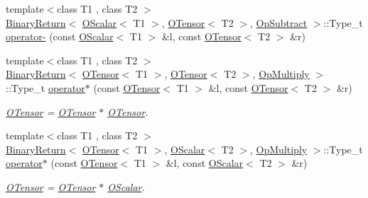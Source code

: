 \begin{DoxyCompactItemize}
\item 
{\footnotesize template$<$class T1 , class T2 $>$ }\\\mbox{\hyperlink{structENSEM_1_1BinaryReturn}{Binary\+Return}}$<$ \mbox{\hyperlink{classENSEM_1_1OScalar}{O\+Scalar}}$<$ T1 $>$, \mbox{\hyperlink{classENSEM_1_1OTensor}{O\+Tensor}}$<$ T2 $>$, \mbox{\hyperlink{structENSEM_1_1OpSubtract}{Op\+Subtract}} $>$\+::Type\+\_\+t \mbox{\hyperlink{group__obstensor_gadc53621528bc3dd8257b504bff4ec21e}{operator-\/}} (const \mbox{\hyperlink{classENSEM_1_1OScalar}{O\+Scalar}}$<$ T1 $>$ \&l, const \mbox{\hyperlink{classENSEM_1_1OTensor}{O\+Tensor}}$<$ T2 $>$ \&r)
\item 
{\footnotesize template$<$class T1 , class T2 $>$ }\\\mbox{\hyperlink{structENSEM_1_1BinaryReturn}{Binary\+Return}}$<$ \mbox{\hyperlink{classENSEM_1_1OTensor}{O\+Tensor}}$<$ T1 $>$, \mbox{\hyperlink{classENSEM_1_1OTensor}{O\+Tensor}}$<$ T2 $>$, \mbox{\hyperlink{structENSEM_1_1OpMultiply}{Op\+Multiply}} $>$\+::Type\+\_\+t \mbox{\hyperlink{group__obstensor_ga45559bd4234015a910a92c2eb80a69d5}{operator$\ast$}} (const \mbox{\hyperlink{classENSEM_1_1OTensor}{O\+Tensor}}$<$ T1 $>$ \&l, const \mbox{\hyperlink{classENSEM_1_1OTensor}{O\+Tensor}}$<$ T2 $>$ \&r)
\begin{DoxyCompactList}\small\item\em \mbox{\hyperlink{classENSEM_1_1OTensor}{O\+Tensor}} = \mbox{\hyperlink{classENSEM_1_1OTensor}{O\+Tensor}} $\ast$ \mbox{\hyperlink{classENSEM_1_1OTensor}{O\+Tensor}}. \end{DoxyCompactList}\item 
{\footnotesize template$<$class T1 , class T2 $>$ }\\\mbox{\hyperlink{structENSEM_1_1BinaryReturn}{Binary\+Return}}$<$ \mbox{\hyperlink{classENSEM_1_1OTensor}{O\+Tensor}}$<$ T1 $>$, \mbox{\hyperlink{classENSEM_1_1OScalar}{O\+Scalar}}$<$ T2 $>$, \mbox{\hyperlink{structENSEM_1_1OpMultiply}{Op\+Multiply}} $>$\+::Type\+\_\+t \mbox{\hyperlink{group__obstensor_gad60dc9814d8cddbdf21babfd0bff14c4}{operator$\ast$}} (const \mbox{\hyperlink{classENSEM_1_1OTensor}{O\+Tensor}}$<$ T1 $>$ \&l, const \mbox{\hyperlink{classENSEM_1_1OScalar}{O\+Scalar}}$<$ T2 $>$ \&r)
\begin{DoxyCompactList}\small\item\em \mbox{\hyperlink{classENSEM_1_1OTensor}{O\+Tensor}} = \mbox{\hyperlink{classENSEM_1_1OTensor}{O\+Tensor}} $\ast$ \mbox{\hyperlink{classENSEM_1_1OScalar}{O\+Scalar}}. \end{DoxyCompactList}\item 

\end{DoxyCompactItemize}
